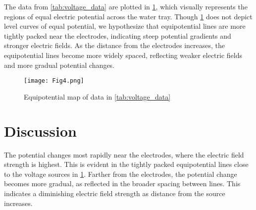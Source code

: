\documentclass[10pt,journal,twoside]{IEEEtran}
\begin{document}
The data from \cref{tab:voltage_data} are plotted in \cref{fig:equipotential_map}, which visually represents the regions of equal electric potential across the water tray. Though \cref{fig:equipotential_map} does not depict level curves of equal potential, we hypothesize that equipotential lines are more tightly packed near the electrodes, indicating steep potential gradients and stronger electric fields. As the distance from the electrodes increases, the equipotential lines become more widely spaced, reflecting weaker electric fields and more gradual potential changes.
\begin{figure}
    \centering
    \texttt{[image: Fig4.png]}
    \caption{Equipotential map of data in \cref{tab:voltage_data}}
    \label{fig:equipotential_map}
\end{figure}






\section{Discussion}
The potential changes most rapidly near the electrodes, where the electric field strength is highest. This is evident in the tightly packed equipotential lines close to the voltage sources in \cref{fig:equipotential_map}. Farther from the electrodes, the potential change becomes more gradual, as reflected in the broader spacing between lines. This indicates a diminishing electric field strength as distance from the source increases.

\end{document}
